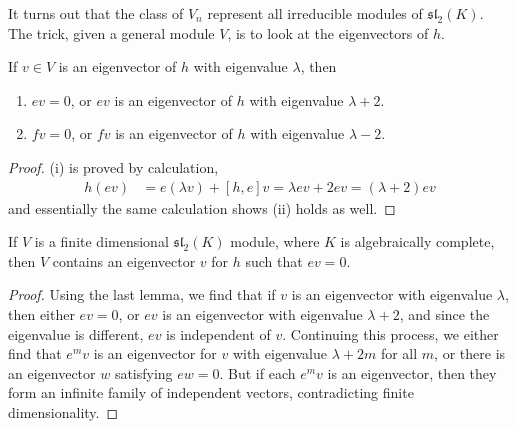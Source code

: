 It turns out that the class of $V_n$ represent all irreducible modules of $\mathfrak{sl}_2(K)$. The trick, given a general module $V$, is to look at the eigenvectors of $h$.

\begin{lemma}
    If $v \in V$ is an eigenvector of $h$ with eigenvalue $\lambda$, then
    \begin{enumerate}
        \item[(i)] $ev = 0$, or $ev$ is an eigenvector of $h$ with eigenvalue $\lambda + 2$.
        \item[(ii)] $fv = 0$, or $fv$ is an eigenvector of $h$ with eigenvalue $\lambda - 2$.
    \end{enumerate}
\end{lemma}
\begin{proof}
    (i) is proved by calculation,
    \begin{align*}
        h(ev) &= e(\lambda v) + [h, e] v = \lambda ev + 2ev = (\lambda + 2) ev
    \end{align*}
    and essentially the same calculation shows (ii) holds as well.
\end{proof}

\begin{lemma}
    If $V$ is a finite dimensional $\mathfrak{sl}_2(K)$ module, where $K$ is algebraically complete, then $V$ contains an eigenvector $v$ for $h$ such that $ev = 0$.
\end{lemma}
\begin{proof}
    Using the last lemma, we find that if $v$ is an eigenvector with eigenvalue $\lambda$, then either $ev = 0$, or $ev$ is an eigenvector with eigenvalue $\lambda + 2$, and since the eigenvalue is different, $ev$ is independent of $v$. Continuing this process, we either find that $e^m v$ is an eigenvector for $v$ with eigenvalue $\lambda + 2m$ for all $m$, or there is an eigenvector $w$ satisfying $ew = 0$. But if each $e^m v$ is an eigenvector, then they form an infinite family of independent vectors, contradicting finite dimensionality.
\end{proof}


